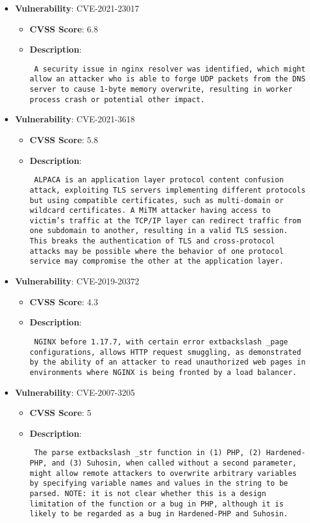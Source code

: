 \documentclass{article}
\begin{document}
\begin{itemize}
        \item \textbf{Vulnerability}: CVE-2021-23017
        \begin{itemize}
            \item \textbf{CVSS Score}:  6.8 
            \item \textbf{Description}: \parbox{\linewidth}{\texttt{ A security issue in nginx resolver was identified, which might allow an attacker who is able to forge UDP packets from the DNS server to cause 1-byte memory overwrite, resulting in worker process crash or potential other impact. }}
        \end{itemize}
    
        \item \textbf{Vulnerability}: CVE-2021-3618
        \begin{itemize}
            \item \textbf{CVSS Score}:  5.8 
            \item \textbf{Description}: \parbox{\linewidth}{\texttt{ ALPACA is an application layer protocol content confusion attack, exploiting TLS servers implementing different protocols but using compatible certificates, such as multi-domain or wildcard certificates. A MiTM attacker having access to victim's traffic at the TCP/IP layer can redirect traffic from one subdomain to another, resulting in a valid TLS session. This breaks the authentication of TLS and cross-protocol attacks may be possible where the behavior of one protocol service may compromise the other at the application layer. }}
        \end{itemize}
    
        \item \textbf{Vulnerability}: CVE-2019-20372
        \begin{itemize}
            \item \textbf{CVSS Score}:  4.3 
            \item \textbf{Description}: \parbox{\linewidth}{\texttt{ NGINX before 1.17.7, with certain error	extbackslash _page configurations, allows HTTP request smuggling, as demonstrated by the ability of an attacker to read unauthorized web pages in environments where NGINX is being fronted by a load balancer. }}
        \end{itemize}
    
        \item \textbf{Vulnerability}: CVE-2007-3205
        \begin{itemize}
            \item \textbf{CVSS Score}:  5 
            \item \textbf{Description}: \parbox{\linewidth}{\texttt{ The parse	extbackslash _str function in (1) PHP, (2) Hardened-PHP, and (3) Suhosin, when called without a second parameter, might allow remote attackers to overwrite arbitrary variables by specifying variable names and values in the string to be parsed.  NOTE: it is not clear whether this is a design limitation of the function or a bug in PHP, although it is likely to be regarded as a bug in Hardened-PHP and Suhosin. }}
        \end{itemize}
    

\end{itemize}
\end{document}
